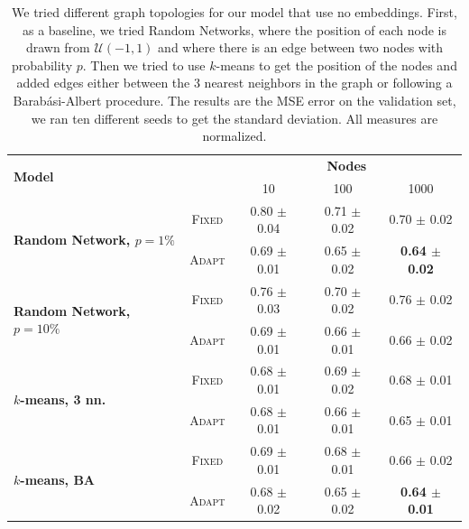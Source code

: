\documentclass[a4paper,10pt]{article}
\begin{document}
\begin{table}
  \centering
  \begin{tabular}{lcccc} \toprule
    \multirow{2}{*}{\textbf{Model}}                      &                            & \multicolumn{3}{c}{\textbf{Nodes}}                                                           \\ \cmidrule(lr){3-5}
                                                         &                            & 10                                 & 100                    & 1000                           \\ \hline
    \multirow{2}{*}{\textbf{Random Network, $p=1\%$} }   & \scriptsize \textsc{Fixed} & 0.80  \tiny $\pm$ 0.04             & 0.71  \tiny $\pm$ 0.02 & 0.70 \tiny $\pm$ 0.02          \\
                                                         & \scriptsize \textsc{Adapt} & 0.69 \tiny $\pm$ 0.01              & 0.65 \tiny $\pm$ 0.02  & \textbf{0.64 \tiny $\pm$ 0.02} \\
    \multirow{2}{*}{\textbf{Random Network, $p=10\%$}}   & \scriptsize \textsc{Fixed} & 0.76  \tiny $\pm$ 0.03             & 0.70  \tiny $\pm$ 0.02 & 0.76 \tiny $\pm$ 0.02          \\
                                                         & \scriptsize \textsc{Adapt} & 0.69 \tiny $\pm$ 0.01              & 0.66 \tiny $\pm$ 0.01  & 0.66 \tiny $\pm$ 0.02          \\
    \multirow{2}{*}{\textbf{$k$-means, 3 nn.}          } & \scriptsize \textsc{Fixed} & 0.68  \tiny $\pm$ 0.01             & 0.69  \tiny $\pm$ 0.02 & 0.68 \tiny $\pm$ 0.01          \\
                                                         & \scriptsize \textsc{Adapt} & 0.68 \tiny $\pm$ 0.01              & 0.66 \tiny $\pm$ 0.01  & 0.65 \tiny $\pm$ 0.01          \\
    \multirow{2}{*}{\textbf{$k$-means, BA}             } & \scriptsize \textsc{Fixed} & 0.69  \tiny $\pm$ 0.01             & 0.68  \tiny $\pm$ 0.01 & 0.66 \tiny $\pm$ 0.02          \\
                                                         & \scriptsize \textsc{Adapt} & 0.68 \tiny $\pm$ 0.02              & 0.65 \tiny $\pm$ 0.02  & \textbf{0.64 \tiny $\pm$ 0.01} \\

    \bottomrule
  \end{tabular}
  \caption{
    We tried different graph topologies for our model that use no embeddings. First, as a baseline, we tried Random Networks, where the position of each node is drawn from $\mathcal{U}(-1,1)$ and where there is an edge between two nodes with probability $p$. Then we tried to use $k$-means to get the position of the nodes and added edges either between the 3 nearest neighbors in the graph or following a Barab\'asi-Albert procedure. The results are the MSE error on the validation set, we ran ten different seeds to get the standard deviation. All measures are normalized.
  }
  \label{tab:graphs}
\end{table}
\end{document}

